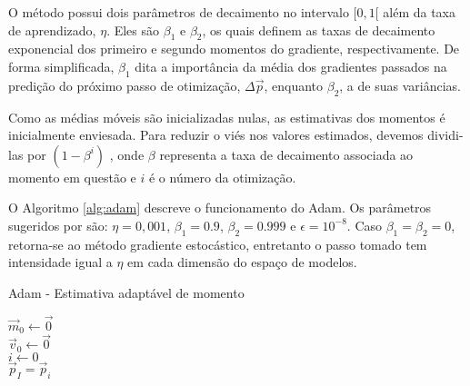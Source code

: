       O método possui dois parâmetros de decaimento no intervalo $[0,1[$ além da taxa de aprendizado, $\eta$. Eles são $\beta_1$ e $\beta_2$, os quais definem as taxas de decaimento exponencial dos primeiro e segundo momentos do gradiente, respectivamente. De forma simplificada, $\beta_1$ dita a importância da média dos gradientes passados na predição do próximo passo de otimização, $\Delta \vec{p}$, enquanto $\beta_2$, a de suas variâncias.

      Como as médias móveis são inicializadas nulas, as estimativas dos momentos é inicialmente enviesada. Para reduzir o viés nos valores estimados, devemos dividi-las por $(1-\beta^i)$ , onde $\beta$ representa a taxa de decaimento associada ao momento em questão e $i$ é o número da otimização.

      O Algoritmo \ref{alg:adam} descreve o funcionamento do Adam. Os parâmetros sugeridos por  são: $\eta= 0,001$, $\beta_1= 0.9$, $\beta_2= 0.999$ e $\epsilon= 10^{-8}$. Caso $\beta_1 = \beta_2 = 0$, retorna-se ao método gradiente estocástico, entretanto o passo tomado tem intensidade igual a $\eta$ em cada dimensão do espaço de modelos.

      \begin{algorithm}
        \caption{Adam - Estimativa adaptável de momento}\label{alg:adam}
        \Entrada{$\beta_1 \in [0,1[$: taxa de decaimento exponencial do primeiro momento}
        \Entrada{$\beta_2 \in [0,1[$: taxa de decaimento exponencial do segundo momento}
        \BlankLine
        $\vec{m}_0 \gets \vec{0}$ \\
        $\vec{v}_0 \gets \vec{0}$ \\
        $i \gets 0$ \\

        $\vec{p}_I = \vec{p}_i$
      \end{algorithm}

